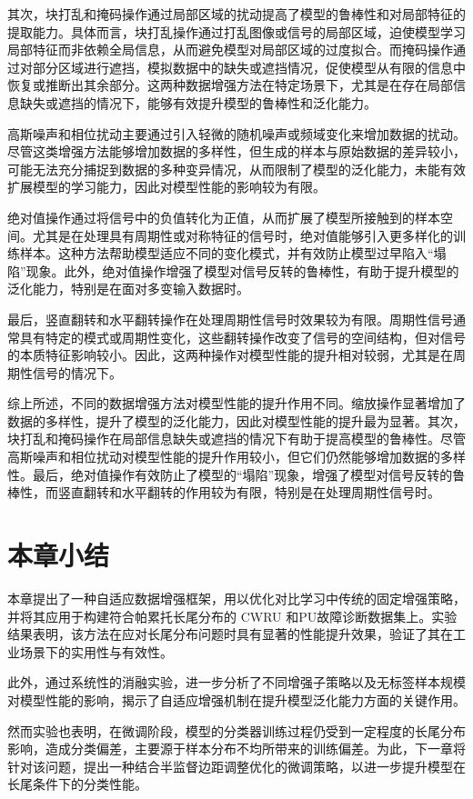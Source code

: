 \documentclass[master]{thesis-uestc}
\begin{document}
其次，块打乱和掩码操作通过局部区域的扰动提高了模型的鲁棒性和对局部特征的提取能力。具体而言，块打乱操作通过打乱图像或信号的局部区域，迫使模型学习局部特征而非依赖全局信息，从而避免模型对局部区域的过度拟合。而掩码操作通过对部分区域进行遮挡，模拟数据中的缺失或遮挡情况，促使模型从有限的信息中恢复或推断出其余部分。这两种数据增强方法在特定场景下，尤其是在存在局部信息缺失或遮挡的情况下，能够有效提升模型的鲁棒性和泛化能力。

高斯噪声和相位扰动主要通过引入轻微的随机噪声或频域变化来增加数据的扰动。尽管这类增强方法能够增加数据的多样性，但生成的样本与原始数据的差异较小，可能无法充分捕捉到数据的多种变异情况，从而限制了模型的泛化能力，未能有效扩展模型的学习能力，因此对模型性能的影响较为有限。

绝对值操作通过将信号中的负值转化为正值，从而扩展了模型所接触到的样本空间。尤其是在处理具有周期性或对称特征的信号时，绝对值能够引入更多样化的训练样本。这种方法帮助模型适应不同的变化模式，并有效防止模型过早陷入“塌陷”现象。此外，绝对值操作增强了模型对信号反转的鲁棒性，有助于提升模型的泛化能力，特别是在面对多变输入数据时。

最后，竖直翻转和水平翻转操作在处理周期性信号时效果较为有限。周期性信号通常具有特定的模式或周期性变化，这些翻转操作改变了信号的空间结构，但对信号的本质特征影响较小。因此，这两种操作对模型性能的提升相对较弱，尤其是在周期性信号的情况下。


综上所述，不同的数据增强方法对模型性能的提升作用不同。缩放操作显著增加了数据的多样性，提升了模型的泛化能力，因此对模型性能的提升最为显著。其次，块打乱和掩码操作在局部信息缺失或遮挡的情况下有助于提高模型的鲁棒性。尽管高斯噪声和相位扰动对模型性能的提升作用较小，但它们仍然能够增加数据的多样性。最后，绝对值操作有效防止了模型的“塌陷”现象，增强了模型对信号反转的鲁棒性，而竖直翻转和水平翻转的作用较为有限，特别是在处理周期性信号时。

\FloatBarrier  %
\section{本章小结}
本章提出了一种自适应数据增强框架，用以优化对比学习中传统的固定增强策略，并将其应用于构建符合帕累托长尾分布的 CWRU 和PU故障诊断数据集上。实验结果表明，该方法在应对长尾分布问题时具有显著的性能提升效果，验证了其在工业场景下的实用性与有效性。

此外，通过系统性的消融实验，进一步分析了不同增强子策略以及无标签样本规模对模型性能的影响，揭示了自适应增强机制在提升模型泛化能力方面的关键作用。

然而实验也表明，在微调阶段，模型的分类器训练过程仍受到一定程度的长尾分布影响，造成分类偏差，主要源于样本分布不均所带来的训练偏差。为此，下一章将针对该问题，提出一种结合半监督边距调整优化的微调策略，以进一步提升模型在长尾条件下的分类性能。
\end{document}
